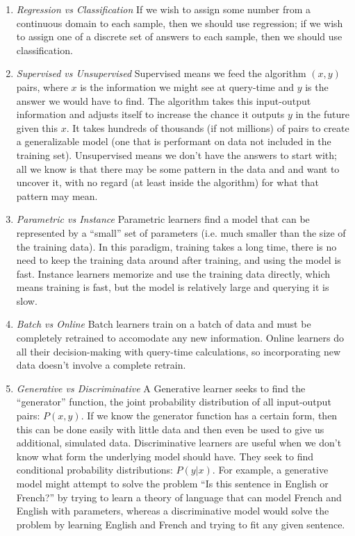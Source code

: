 \documentclass[]{article}
\begin{document}
  \begin{enumerate}
    \item \textit{Regression vs Classification} If we wish to assign some number from a continuous domain to each sample, then we should use regression; if we wish to assign one of a discrete set of answers to each sample, then we should use classification.

    \item \textit{Supervised vs Unsupervised} Supervised means we feed the algorithm $(x,y)$ pairs, where $x$ is the information we might see at query-time and $y$ is the answer we would have to find. The algorithm takes this input-output information and adjusts itself to increase the chance it outputs $y$ in the future given this $x$. It takes hundreds of thousands (if not millions) of pairs to create a generalizable model (one that is performant on data not included in the training set). Unsupervised means we don't have the answers to start with; all we know is that there may be some pattern in the data and and want to uncover it, with no regard (at least inside the algorithm) for what that pattern may mean.

    \item \textit{Parametric vs Instance} Parametric learners find a model that can be represented by a ``small'' set of parameters (i.e. much smaller than the size of the training data). In this paradigm, training takes a long time, there is no need to keep the training data around after training, and using the model is fast. Instance learners memorize and use the training data directly, which means training is fast, but the model is relatively large and querying it is slow.

    \item \textit{Batch vs Online} Batch learners train on a batch of data and must be completely retrained to accomodate any new information. Online learners do all their decision-making with query-time calculations, so incorporating new data doesn't involve a complete retrain.

    \item \textit{Generative vs Discriminative} A Generative learner seeks to find the ``generator'' function, the joint probability distribution of all input-output pairs: $P(x,y)$. If we know the generator function has a certain form, then this can be done easily with little data and then even be used to give us additional, simulated data. Discriminative learners are useful when we don't know what form the underlying model should have. They seek to find conditional probability distributions: $P(y|x)$. For example, a generative model might attempt to solve the problem ``Is this sentence in English or French?'' by trying to learn a theory of language that can model French and English with parameters, whereas a discriminative model would solve the problem by learning English and French and trying to fit any given sentence.
  \end{enumerate}
\end{document}
